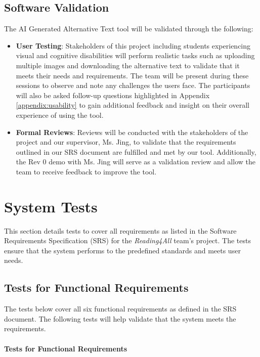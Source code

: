 \documentclass[12pt, titlepage]{article}
\begin{document}
\subsection{Software Validation}
The AI Generated Alternative Text tool will be validated through the following:
\begin{itemize}
  \item \textbf{User Testing}: Stakeholders of this project including
    students experiencing visual
    and cognitive disabilities will perform realistic tasks such as
    uploading multiple images and downloading the alternative text
    to validate that it meets their needs and requirements.
    The team will be present during these sessions to observe and
    note any challenges
    the users face. The participants will also be asked follow-up
    questions highlighted in Appendix \ref{appendix:usability} to
    gain additional feedback and insight
    on their overall experience of using the tool.
  \item \textbf{Formal Reviews}: Reviews will be conducted with the
    stakeholders of the project and our supervisor, Ms. Jing, to
    validate that the requirements
    outlined in our SRS document are fulfilled and met by our tool.
    Additionally, the Rev 0 demo with Ms. Jing will serve as a
    validation review and allow the team
    to receive feedback to improve the tool.
\end{itemize}

\section{System Tests}
\label{System Tests Desc}

This section details tests to cover all requirements as listed in the
Software Requirements Specification (SRS) for the \textit{Reading4All} team's project. The
tests ensure that the system performs to the predefined standards and
meets user needs.

\subsection{Tests for Functional Requirements}

The tests below cover all six functional requirements as defined in
the SRS document. The following tests will help validate that the system meets 
the requirements. 

\paragraph{Tests for Functional Requirements}
\end{document}
